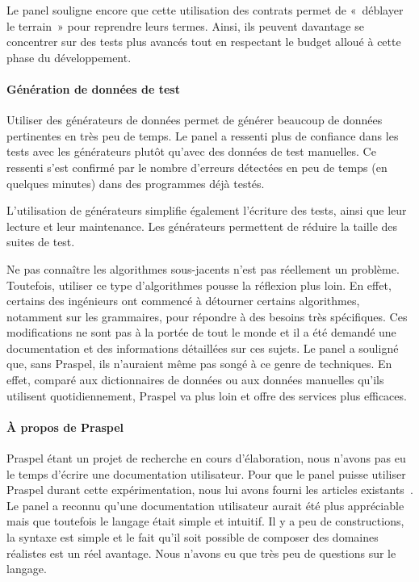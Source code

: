 Le panel souligne encore que cette utilisation des contrats permet de «~déblayer
le terrain~» pour reprendre leurs termes. Ainsi, ils peuvent davantage se
concentrer sur des tests plus avancés tout en respectant le budget alloué à
cette phase du développement.

\paragraph{Génération de données de test} Utiliser des générateurs de données
permet de générer beaucoup de données pertinentes en très peu de temps. Le panel
a ressenti plus de confiance dans les tests avec les générateurs plutôt qu'avec
des données de test manuelles. Ce ressenti s'est confirmé par le nombre
d'erreurs détectées en peu de temps (en quelques minutes) dans des programmes
déjà testés.

L'utilisation de générateurs simplifie également l'écriture des tests, ainsi que
leur lecture et leur maintenance. Les générateurs permettent de réduire la
taille des suites de test.

Ne pas connaître les algorithmes sous-jacents n'est pas réellement un problème.
Toutefois, utiliser ce type d'algorithmes pousse la réflexion plus loin. En
effet, certains des ingénieurs ont commencé à détourner certains algorithmes,
notamment sur les grammaires, pour répondre à des besoins très spécifiques. Ces
modifications ne sont pas à la portée de tout le monde et il a été demandé une
documentation et des informations détaillées sur ces sujets. Le panel a souligné
que, sans Praspel, ils n'auraient même pas songé à ce genre de techniques. En
effet, comparé aux dictionnaires de données ou aux données manuelles qu'ils
utilisent quotidiennement, Praspel va plus loin et offre des services plus
efficaces.

\paragraph{À propos de Praspel} Praspel étant un projet de recherche en cours
d'élaboration, nous n'avons pas eu le temps d'écrire une documentation
utilisateur. Pour que le panel puisse utiliser Praspel durant cette
expérimentation, nous lui avons fourni les articles
existants~. Le panel a reconnu
qu'une documentation utilisateur aurait été plus appréciable mais que toutefois
le langage était simple et intuitif. Il y a peu de constructions, la syntaxe est
simple et le fait qu'il soit possible de composer des domaines réalistes est un
réel avantage. Nous n'avons eu que très peu de questions sur le langage.

